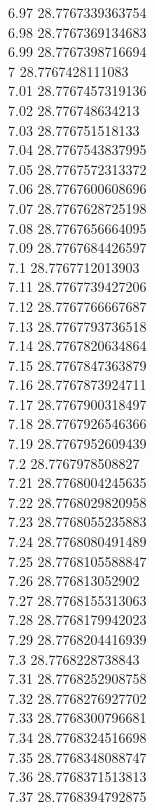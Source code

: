 {6.97	28.7767339363754\\
6.98	28.7767369134683\\
6.99	28.7767398716694\\
7	28.7767428111083\\
7.01	28.7767457319136\\
7.02	28.776748634213\\
7.03	28.776751518133\\
7.04	28.7767543837995\\
7.05	28.7767572313372\\
7.06	28.7767600608696\\
7.07	28.7767628725198\\
7.08	28.7767656664095\\
7.09	28.7767684426597\\
7.1	28.7767712013903\\
7.11	28.7767739427206\\
7.12	28.7767766667687\\
7.13	28.7767793736518\\
7.14	28.7767820634864\\
7.15	28.7767847363879\\
7.16	28.7767873924711\\
7.17	28.7767900318497\\
7.18	28.7767926546366\\
7.19	28.7767952609439\\
7.2	28.7767978508827\\
7.21	28.7768004245635\\
7.22	28.7768029820958\\
7.23	28.7768055235883\\
7.24	28.7768080491489\\
7.25	28.7768105588847\\
7.26	28.776813052902\\
7.27	28.7768155313063\\
7.28	28.7768179942023\\
7.29	28.7768204416939\\
7.3	28.7768228738843\\
7.31	28.7768252908758\\
7.32	28.7768276927702\\
7.33	28.7768300796681\\
7.34	28.7768324516698\\
7.35	28.7768348088747\\
7.36	28.7768371513813\\
7.37	28.7768394792875\\
}
